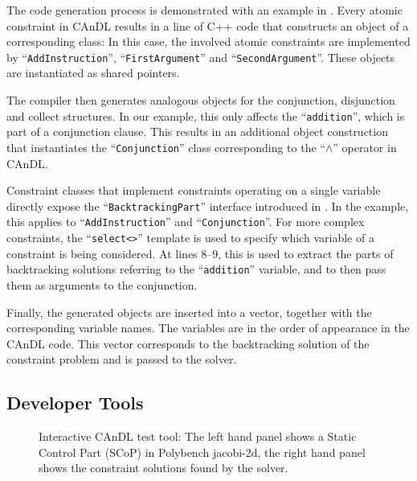     The code generation process is demonstrated with an example in
    .
    Every atomic constraint in CAnDL results in a line of C++ code that
    constructs an object of a corresponding class:
    In this case, the involved atomic constraints are implemented by
    ``{\tt AddInstruction}'', ``{\tt FirstArgument}'' and
    ``{\tt SecondArgument}''.
    These objects are instantiated as shared pointers.

    The compiler then generates analogous objects for the conjunction,
    disjunction and collect structures.
    In our example, this only affects the ``{\tt addition}'', which is part
    of a conjunction clause.
    This results in an additional object construction that instantiates the
    ``{\tt Conjunction}'' class corresponding to the ``$\land$'' operator
    in CAnDL.

    Constraint classes that implement constraints operating on a single
    variable directly expose the ``{\tt BacktrackingPart}'' interface
    introduced in .
    In the example, this applies to ``{\tt AddInstruction}'' and
    ``{\tt Conjunction}''.
    For more complex constraints, the ``{\tt select<>}'' template is used to
    specify which variable of a constraint is being considered.
    At lines 8--9, this is used to extract the parts of backtracking solutions
    referring to the ``{\tt addition}'' variable, and to then pass them as
    arguments to the conjunction.

    Finally, the generated objects are inserted into a vector, together with the
    corresponding variable names.
    The variables are in the order of appearance in the CAnDL code.
    This vector corresponds to the backtracking solution of the constraint
    problem and is passed to the solver.

\subsection{Developer Tools}

\begin{figure}[t]
\centering
\setlength{\fboxsep}{-0.5pt}\setlength{\fboxrule}{0.5pt}
\caption{Interactive CAnDL test tool: The left hand panel shows a Static Control
        Part (SCoP) in Polybench jacobi-2d, the right hand panel shows the
        constraint solutions found by the solver.}
\label{fig:gui}
\end{figure}

